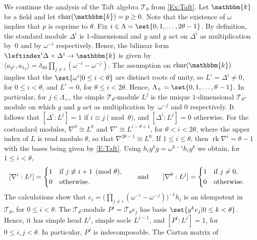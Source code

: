 \documentclass[a4paper,11pt]{amsart}
\let\<\langle
\let\>\rangle
\numberwithin{equation}{subsection}
\theoremstyle{definition}
\theoremstyle{theorem}
\theoremstyle{remark}
\newcommand\Taft[1][\theta]{\mathscr{T}_{#1}}
\newcommand\op{\operatorname}
\newcommand\kk{\mathbbm{k}}
\begin{document}
   \begin{Example}\label{Ex:TaftII}
     We continue the analysis of the Taft algebra
     $\Taft$ from \autoref{Ex:Taft}. Let $\kk$ be a field and let $\op{char}(\kk)=p\geq0$. Note that the existence of $\omega$ implies  that $p$ is coprime to $\theta$.
     Fix $i\in\Lambda=\set{0,1,\dots,2\theta-1}$. By
     definition, the standard module $\Delta^i$ is $1$-dimensional and
     $y$ and $g$ act on $\Delta^i$ as multiplication by~$0$ and by $\omega^{-i}$
     respectively. Hence, the bilinear form
     $\leftindex^i\Delta\times\Delta^i\to\kk$ is given by
     $\<a_{y^k},a_{1_T}\>=\delta_{k0}{\prod_{j\ne i}(\omega^{-i}-\omega^{-j})}$.
     The assumption on $\op{char}(\kk)$ implies that  the
     $\set{\omega^i|0\le i<\theta}$ are distinct roots of unity, so
     $L^i=\Delta^i\ne0$, for $0\le i<\theta$, and  $L^i=0$, for
     $\theta\le i<2\theta$.
     Hence, $\Lambda_+=\set{0,1,\dots,\theta-1}$. In particular, for $j\in \Lambda_+$, the
     simple $\Taft$-module $L^j$ is the unique $1$-dimensional $\Taft$-module on which $g$ and $y$ act as
     multiplication by~$\omega^{-j}$ and $0$ respectively. It follows that
     $[\Delta^i:L^j]=1$ if $i\equiv j\pmod \theta$, and $[\Delta^i:L^j]=0$
     otherwise. For the costandard modules, $\nabla^0\cong L^0$ and
     $\nabla^i\cong L^{i-\theta+1}$, for $\theta<i<2\theta$, where the upper index of $L$ is read modulo $\theta$, so that $\nabla^{2\theta-1}\cong L^0$. If $1\le i\le
     \theta$, then
     $\op{rk}\nabla^i=\theta-1$ with the bases being given by \autoref{E:Taft}.
     Using  $h_iy^kg = \omega^{k-i}h_iy^k$ we obtain, for $1\le i<\theta$,
     \[
        [\nabla^i:L^j] = \begin{cases*}
           1 & if $j\not\equiv i+1 \pmod \theta$,\\
           0 & otherwise.
        \end{cases*}
        \qquad\text{and}\qquad
        [\nabla^\theta:L^j] = \begin{cases*}
           1 & if $j\ne0$,\\
           0 & otherwise.
        \end{cases*}
     \]
     The calculations show that $e_i=\bigl(\prod_{j\ne i}(\omega^{-i}-\omega^{-j})\bigr)^{-1}h_i$ is
     an idempotent in~$\Taft$, for $0\le i<\theta$.  The $\Taft$-module
      $P^j=\Taft e_j$ has basis $\set{y^ke_j|0\le k<\theta}$. Hence, it has
      simple head $L^j$, simple socle $L^{j-1}$, and $[P^i:L^j]=1$, for $0\le i,j<\theta$.
      In particular,  $P^j$ is indecomposable. The Cartan matrix of

\end{Example}
\end{document}
